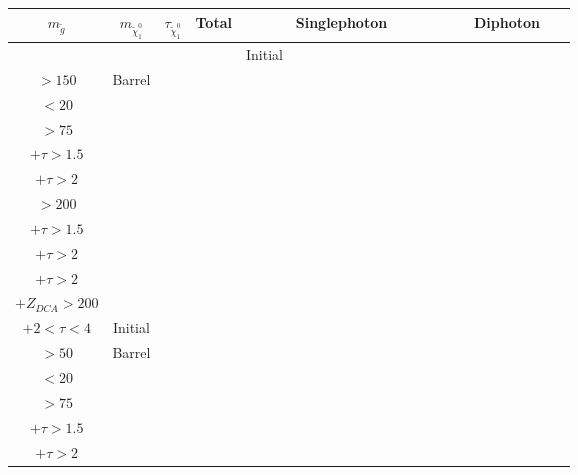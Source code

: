 \documentclass[8pt]{extarticle}
\begin{document}
\begin{longtable}{|c|c|c|c|c|c|c|c|c|c|c|c|c|c|c|c|c|c|c|c|c|c|c|c|c|}
\hline 
$m_{\tilde{g}}$ & $m_{\tilde{\chi}_1^0}$ & $\tau_{\tilde{\chi}_1^0}$ & Total & \multicolumn{12}{|c|}{Singlephoton} & \multicolumn{9}{|c|}{Diphoton} \\ 
\hline 
 & & & & Initial & \begin{tabular}{@{}c@{}} $p_T$ \\ $> 150$\end{tabular} & Barrel & \begin{tabular}{@{}c@{}} $E_T^{miss}$ \\ $< 20$\end{tabular} & \begin{tabular}{@{}c@{}} $E_T^{miss}$ \\ $> 75$\end{tabular} & \begin{tabular}{@{}c@{}} $E_T^{miss} > 75$ \\ $+ \tau > 1.5$ \end{tabular} & \begin{tabular}{@{}c@{}} $E_T^{miss} > 75$ \\ $+ \tau > 2$ \end{tabular} & \begin{tabular}{@{}c@{}} $E_T^{miss}$ \\ $> 200$\end{tabular} & \begin{tabular}{@{}c@{}} $E_T^{miss} > 200$ \\ $+ \tau > 1.5$ \end{tabular} & \begin{tabular}{@{}c@{}} $E_T^{miss} > 200$ \\ $+ \tau > 2$ \end{tabular} & \begin{tabular}{@{}c@{}} $E_T^{miss} > 200$ \\ $+ \tau > 2$ \\ $+Z_{DCA} > 200$\end{tabular} & \begin{tabular}{@{}c@{}} $E_{T}^{miss} > 200$ \\ $+ 2 < \tau < 4$ \end{tabular} & Initial & \begin{tabular}{@{}c@{}} $p_T$ \\ $> 50$\end{tabular} & Barrel & \begin{tabular}{@{}c@{}} $E_T^{miss}$ \\ $< 20$\end{tabular} & \begin{tabular}{@{}c@{}} $E_T^{miss}$ \\ $> 75$\end{tabular} & \begin{tabular}{@{}c@{}} $E_T^{miss} > 75$ \\ $+ \tau > 1.5$\end{tabular} & \begin{tabular}{@{}c@{}} $E_T^{miss} > 75$ \\ $+ \tau > 2$ 
\end{longtable}
\end{document}
